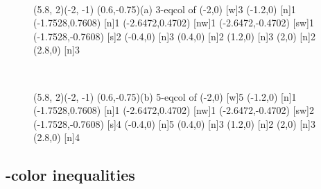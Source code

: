 \begin{figure}[h]
  \centering ~~~~~~~~~~~
\begin{graph}(5.8, 2)(-2, -1)
	\freetext(0.6,-0.75){(a) 3-eqcol of }
	(-2,0)
	{3}
	(-1.2,0)
	{1}
	(-1.7528,0.7608)
	{1}
	(-2.6472,0.4702)
	[nw]{1}
	(-2.6472,-0.4702)
	[sw]{1}
	(-1.7528,-0.7608)
	{2}
	(-0.4,0)
	{3}
	(0.4,0)
	{2}
	(1.2,0)
	{3}
	(2,0)
	{2}
	(2.8,0)
	{3}
\end{graph}~~~~~~~
\begin{graph}(5.8, 2)(-2, -1)
	\freetext(0.6,-0.75){(b) 5-eqcol of }
	(-2,0)
	{5}
	(-1.2,0)
	{1}
	(-1.7528,0.7608)
	{1}
	(-2.6472,0.4702)
	[nw]{1}
	(-2.6472,-0.4702)
	[sw]{2}
	(-1.7528,-0.7608)
	{4}
	(-0.4,0)
	{5}
	(0.4,0)
	{3}
	(1.2,0)
	{2}
	(2,0)
	{3}
	(2.8,0)
	{4}
\end{graph}
\caption{}
  \label{minigraph4}
\end{figure}

\subsection{-color inequalities}

